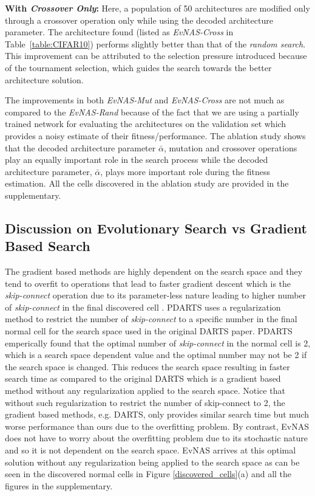 \documentclass[final]{cvpr}
\begin{document}
\textbf{With \textit{Crossover Only}:} Here, a population of 50 architectures are
modified only through a crossover operation only while using the decoded architecture parameter.
The architecture found (listed as \textit{EvNAS-Cross} in Table~\ref{table:CIFAR10})
performs slightly better than that of the \textit{random search}. This improvement can be attributed
to the selection pressure \cite{eiben2003introduction} introduced because of the tournament
selection, which guides the search towards the better architecture solution. 

The improvements in both \textit{EvNAS-Mut} and \textit{EvNAS-Cross} are not much as compared to
the \textit{EvNAS-Rand} because of the fact that we are using a partially trained network for
evaluating the architectures on the validation set which provides a noisy estimate of their
fitness/performance. The ablation study shows that the decoded architecture parameter
$\bar{\alpha}$, mutation and crossover operations play an equally important role in the search process while the decoded
architecture parameter, $\bar{\alpha}$, plays more important role during the fitness estimation.
All the cells discovered in the ablation study are provided in the supplementary.

\subsection{Discussion on Evolutionary Search vs Gradient Based Search}
The gradient based methods are highly dependent on the search space and they tend to overfit to
operations that lead to faster gradient descent which is the \textit{skip-connect} operation due
to its parameter-less nature leading to higher number of \textit{skip-connect} in the final
discovered cell \cite{Zela2020Understanding}. PDARTS \cite{chen2019progressive} uses a
regularization method to restrict the number of \textit{skip-connect} to a specific number in the
final normal cell for the search space used in the original DARTS paper. PDARTS emperically found
that the optimal number of \textit{skip-connect} in the normal cell is 2, which is a search space
dependent value and the optimal number may not be 2 if the search space is changed. This reduces the
search space resulting in faster search time as compared to the original DARTS which is a gradient
based method without any regularization applied to the search space. Notice that without  such
regularization to restrict the number of skip-connect to 2, the gradient based methods, e.g. DARTS,
only provides similar search time but much worse performance than ours due to the overfitting problem.
By contrast, EvNAS does not have to worry about the overfitting problem due to its stochastic nature
and so it is not dependent on the search space. EvNAS arrives at this optimal solution without any
regularization being applied to the search space as can be seen in the discovered normal cells in
Figure \ref{discovered_cells}(a) and all the figures in the supplementary.
\end{document}

